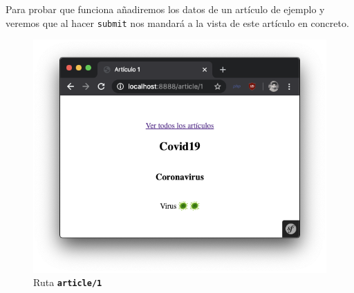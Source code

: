 \clearpage
Para probar que funciona añadiremos los datos de un artículo de ejemplo y veremos que al hacer \texttt{submit} nos mandará a la vista de este artículo en concreto.

\begin{figure}[ht]
  \centering
  \includegraphics[width=\textwidth]{../assets/article_render.png}
  \caption{Ruta \texttt{\textbf{article/1}}}
  \label{fig:article_render}
\end{figure}


